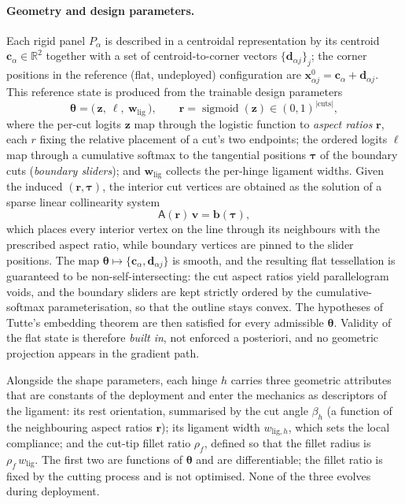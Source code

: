\documentclass[pdflatex,sn-mathphys-num]{sn-jnl}%
\theoremstyle{thmstyleone}%
\theoremstyle{thmstyletwo}%
\theoremstyle{thmstylethree}%
\newcommand{\wlig}{w_{\mathrm{lig}}}
\newcommand{\sigmoid}{\operatorname{sigmoid}}
\begin{document}
\paragraph{Geometry and design parameters.}
Each rigid panel $P_\alpha$ is described in a centroidal representation by its
centroid $\bm{c}_\alpha \in \mathbb{R}^2$ together with a set of
centroid-to-corner vectors $\{\bm{d}_{\alpha j}\}_j$; the corner positions in the
reference (flat, undeployed) configuration are
$\bm{x}_{\alpha j}^{0} = \bm{c}_\alpha + \bm{d}_{\alpha j}$. This reference state
is produced from the trainable design parameters
\begin{equation}
  \bm{\theta} = \bigl(\, \bm{z},\ \bm{\ell},\ \bm{w}_{\mathrm{lig}}\,\bigr),
  \qquad
  \bm{r} = \sigmoid(\bm{z}) \in (0,1)^{\lvert\mathrm{cuts}\rvert},
  \label{eq:design-params}
\end{equation}
where the per-cut logits $\bm{z}$ map through the logistic function to
\emph{aspect ratios} $\bm{r}$, each $r$ fixing the relative placement of a cut's
two endpoints; the ordered logits $\bm{\ell}$ map through a cumulative softmax to
the tangential positions $\bm{\tau}$ of the boundary cuts (\emph{boundary
sliders}); and $\bm{w}_{\mathrm{lig}}$ collects the per-hinge ligament widths.
Given the induced $(\bm{r},\bm{\tau})$, the interior cut vertices are obtained as
the solution of a sparse linear collinearity system
\begin{equation}
  \mathsf{A}(\bm{r})\,\bm{v} = \bm{b}(\bm{\tau}),
  \label{eq:collinearity}
\end{equation}
which places every interior vertex on the line through its neighbours with the
prescribed aspect ratio, while boundary vertices are pinned to the slider
positions. The map $\bm{\theta} \mapsto \{\bm{c}_\alpha, \bm{d}_{\alpha j}\}$ is
smooth, and the resulting flat tessellation is guaranteed to be
non-self-intersecting: the cut aspect ratios yield parallelogram voids, and the
boundary sliders are kept strictly ordered by the cumulative-softmax
parameterisation, so that the outline stays convex. The hypotheses of Tutte's
embedding theorem are then satisfied for every admissible $\bm{\theta}$.
Validity of the flat state is therefore \emph{built in}, not enforced a
posteriori, and no geometric projection appears in the gradient path.

Alongside the shape parameters, each hinge $h$ carries three geometric attributes
that are constants of the deployment and enter the mechanics as descriptors of the
ligament: its rest orientation, summarised by the cut angle $\beta_h$ (a function
of the neighbouring aspect ratios $\bm{r}$); its ligament width
$w_{\mathrm{lig},h}$, which sets the local compliance; and the cut-tip fillet
ratio $\rho_{f}$, defined so that the fillet radius is $\rho_f\,\wlig$. The first
two are functions of $\bm{\theta}$ and are differentiable; the fillet ratio is
fixed by the cutting process and is not optimised. None of the three evolves
during deployment.
\end{document}
